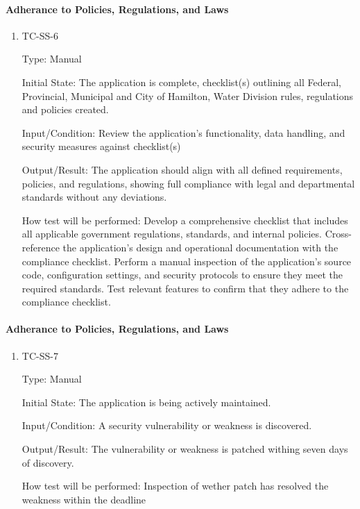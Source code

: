 \documentclass[12pt, titlepage]{article}
\begin{document}
\paragraph{Adherance to Policies, Regulations, and Laws}

\begin{enumerate}

  \item{TC-SS-6\\}

    Type: Manual

    Initial State: The application is complete, checklist(s)
    outlining all Federal, Provincial, Municipal and City of
    Hamilton, Water Division rules, regulations and policies created.

    Input/Condition: Review the application's functionality, data
    handling, and security measures against checklist(s)

    Output/Result: The application should align with all defined
    requirements, policies, and regulations, showing full compliance
    with legal and departmental standards without any deviations.

    How test will be performed: Develop a comprehensive checklist
    that includes all applicable government regulations, standards,
    and internal policies. Cross-reference the application's design
    and operational documentation with the compliance checklist.
    Perform a manual inspection of the application's source code,
    configuration settings, and security protocols to ensure they
    meet the required standards. Test relevant features to confirm
    that they adhere to the compliance checklist.

\end{enumerate}

\paragraph{Adherance to Policies, Regulations, and Laws}

\begin{enumerate}

  \item{TC-SS-7\\}

    Type: Manual

    Initial State: The application is being actively maintained.

    Input/Condition: A security vulnerability or weakness is discovered.

    Output/Result: The vulnerability or weakness is patched withing
    seven days of discovery.

    How test will be performed: Inspection of wether patch has
    resolved the weakness within the deadline

\end{enumerate}
\end{document}
